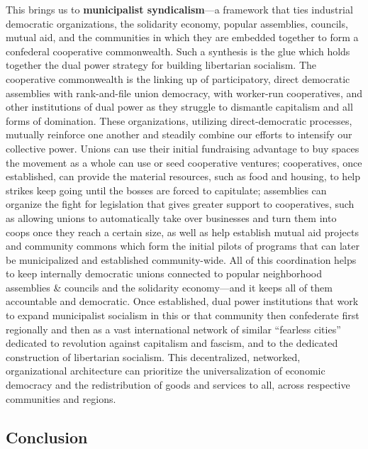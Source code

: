 \documentclass[10pt]{memoir}
\def \href #1#2{#2} %
\begin{document}
This brings us to \textbf{municipalist syndicalism}---a
\href{https://roarmag.org/essays/municipalist-syndicalism-alex-kolokotronis/}{framework}
that ties industrial democratic organizations, the solidarity economy,
popular assemblies, councils, mutual aid, and the communities in which
they are embedded together to form a confederal cooperative
commonwealth. Such a synthesis is the glue which holds together the dual
power strategy for building libertarian socialism. The cooperative
commonwealth is the linking up of participatory, direct democratic
assemblies with rank-and-file union democracy, with worker-run
cooperatives, and other institutions of dual power as they struggle to
dismantle capitalism and all forms of domination. These organizations,
utilizing direct-democratic processes, mutually reinforce one another
and steadily combine our efforts to intensify our collective power.
Unions can use their initial fundraising advantage to buy spaces the
movement as a whole can use or seed cooperative ventures; cooperatives,
once established, can provide the material resources, such as food and
housing, to help strikes keep going until the bosses are forced to
capitulate; assemblies can organize the fight for legislation that gives
greater support to cooperatives, such as allowing unions to
automatically take over businesses and turn them into coops once they
reach a certain size, as well as help establish mutual aid projects and
community commons which form the initial pilots of programs that can
later be municipalized and established community-wide. All of this
coordination helps to keep internally democratic unions connected to
popular neighborhood assemblies \& councils and the solidarity
economy---and it keeps all of them accountable and democratic. Once
established, dual power institutions that work to expand municipalist
socialism in this or that community then confederate first regionally
and then as a vast international network of similar ``fearless cities''
dedicated to revolution against capitalism and fascism, and to the
dedicated construction of libertarian socialism. This decentralized,
networked, organizational architecture can prioritize the
universalization of economic democracy and the redistribution of goods
and services to all, across respective communities and regions.

\subsection{Conclusion}\label{conclusion}
\end{document}
